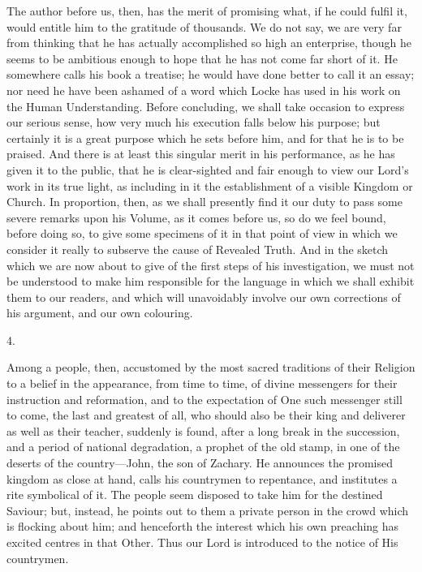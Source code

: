 The author before us, then, has the merit of
promising what, if he could fulfil it, would entitle him to the
gratitude of thousands. We do not say, we are very far from thinking
that he has actually accomplished so high an enterprise, though he
seems to be ambitious enough to hope that he has not come far short of
it. He somewhere calls his book a treatise; he would have done better
to call it an essay; nor need he have been ashamed of a word which
Locke has used in his work on the Human Understanding. Before
concluding, we shall take occasion to express our serious sense, how
very much his execution falls below his purpose; but certainly it is a
great purpose which he sets before him, and for that he is to be
praised. And there is at least this singular merit in his performance,
as he has given it to the public, that he is clear-sighted and fair
enough to view our Lord's work in its true light, as including in it
the establishment of a visible Kingdom or Church. In proportion, then,
as we shall presently find it our duty to pass some severe remarks upon his Volume, as it comes before us, so do we feel bound,
before doing so, to give some specimens of it in that point of view in
which we consider it really to subserve the cause of Revealed Truth.
And in the sketch which we are now about to give of the first steps of
his investigation, we must not be understood to make him responsible
for the language in which we shall exhibit them to our readers, and
which will unavoidably involve our own corrections of his argument,
and our own colouring.

4.

Among a people, then, accustomed by the most
sacred traditions of their Religion to a belief in the appearance,
from time to time, of divine messengers for their instruction and
reformation, and to the expectation of One such messenger still to
come, the last and greatest of all, who should also be their king and
deliverer as well as their teacher, suddenly is found, after a long
break in the succession, and a period of national degradation, a
prophet of the old stamp, in one of the deserts of the country—John,
the son of Zachary. He announces the promised kingdom as close at
hand, calls his countrymen to repentance, and institutes a rite
symbolical of it. The people seem disposed to take him for the
destined Saviour; but, instead, he points out to them a private person
in the crowd which is flocking about him; and henceforth the interest
which his own preaching has excited centres in that Other. Thus our
Lord is introduced to the notice of His countrymen.

